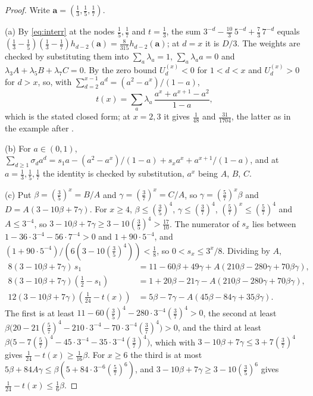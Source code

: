 \documentclass[11pt]{article}
\begin{document}
\begin{proof}
Write $\mathbf a=(\tfrac13,\tfrac15,\tfrac17)$.

(a) By \eqref{eq:interr} at the nodes $\tfrac15,\tfrac17$ and
$t=\tfrac13$, the sum
$3^{-d}-\tfrac{10}3\,5^{-d}+\tfrac73\,7^{-d}$ equals
$(\tfrac13-\tfrac15)(\tfrac13-\tfrac17)h_{d-2}(\mathbf a)
=\tfrac8{315}h_{d-2}(\mathbf a)$; at $d=x$ it is $D/3$.  The weights are
checked by substituting them into $\sum_a\lambda_a=1$,
$\sum_a\lambda_aa=0$ and $\lambda_3A+\lambda_5B+\lambda_7C=0$.  By the zero
bound $U^{(x)}_d<0$ for $1<d<x$ and $U^{(x)}_d>0$ for $d>x$, so, with
$\sum_{d=2}^{x-1}a^d=(a^2-a^x)/(1-a)$,
\[
  t(x)=\sum_a\lambda_a\,\frac{a^x+a^{x+1}-a^2}{1-a},
\]
which is the stated closed form; at $x=2,3$ it gives $\tfrac1{48}$ and
$\tfrac{31}{1704}$, the latter as in the example after
\cite[Theorem~4.3]{coefficient-mass-attainment}.

(b) For $a\in(0,1)$,
$\sum_{d\ge1}\sigma_da^d=s_1a-(a^2-a^x)/(1-a)+s_xa^x+a^{x+1}/(1-a)$, and
at $a=\tfrac13,\tfrac15,\tfrac17$ the identity is checked by substitution,
$a^x$ being $A$, $B$, $C$.

(c) Put $\beta=(\tfrac35)^x=B/A$ and $\gamma=(\tfrac37)^x=C/A$, so
$\gamma=(\tfrac57)^x\beta$ and $D=A(3-10\beta+7\gamma)$.  For $x\ge4$,
$\beta\le(\tfrac35)^4$, $\gamma\le(\tfrac37)^4$, $(\tfrac57)^x\le(\tfrac57)^4$
and $A\le3^{-4}$, so $3-10\beta+7\gamma\ge3-10(\tfrac35)^4>\tfrac{17}{10}$.
The numerator of $s_x$ lies between $1-36\cdot3^{-4}-56\cdot7^{-4}>0$ and
$1+90\cdot5^{-4}$, and
$(1+90\cdot5^{-4})/(6(3-10(\tfrac35)^4))<\tfrac18$, so $0<s_x\le3^x/8$.
Dividing by $A$,
\begin{align*}
  8(3-10\beta+7\gamma)\,s_1&=11-60\beta+49\gamma+A(210\beta-280\gamma+70\beta\gamma),\\
  8(3-10\beta+7\gamma)(\tfrac12-s_1)&=1+20\beta-21\gamma-A(210\beta-280\gamma+70\beta\gamma),\\
  12(3-10\beta+7\gamma)(\tfrac1{24}-t(x))&=5\beta-7\gamma-A(45\beta-84\gamma+35\beta\gamma).
\end{align*}
The first is at least $11-60(\tfrac35)^4-280\cdot3^{-4}(\tfrac37)^4>0$, the
second at least
$\beta\bigl(20-21(\tfrac57)^4-210\cdot3^{-4}-70\cdot3^{-4}(\tfrac37)^4\bigr)>0$,
and the third at least
$\beta\bigl(5-7(\tfrac57)^4-45\cdot3^{-4}-35\cdot3^{-4}(\tfrac37)^4\bigr)$,
which with $3-10\beta+7\gamma\le3+7(\tfrac37)^4$ gives
$\tfrac1{24}-t(x)\ge\tfrac1{16}\beta$.  For $x\ge6$ the third is at most
$5\beta+84A\gamma\le\beta(5+84\cdot3^{-6}(\tfrac57)^6)$, and
$3-10\beta+7\gamma\ge3-10(\tfrac35)^6$ gives
$\tfrac1{24}-t(x)\le\tfrac16\beta$.


\end{proof}
\end{document}
